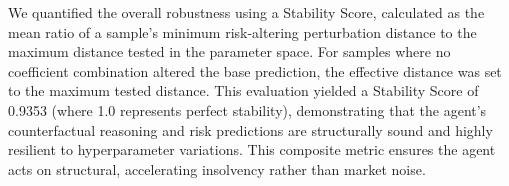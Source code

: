 \documentclass[manuscript,screen,review]{acmart}
\begin{document}

We quantified the overall robustness using a Stability Score, calculated as the mean ratio of a sample's minimum risk-altering perturbation distance to the maximum distance tested in the parameter space. For samples where no coefficient combination altered the base prediction, the effective distance was set to the maximum tested distance. This evaluation yielded a Stability Score of 0.9353 (where 1.0 represents perfect stability), demonstrating that the agent's counterfactual reasoning and risk predictions are structurally sound and highly resilient to hyperparameter variations. This composite metric ensures the agent acts on structural, accelerating insolvency rather than market noise.
\end{document}
